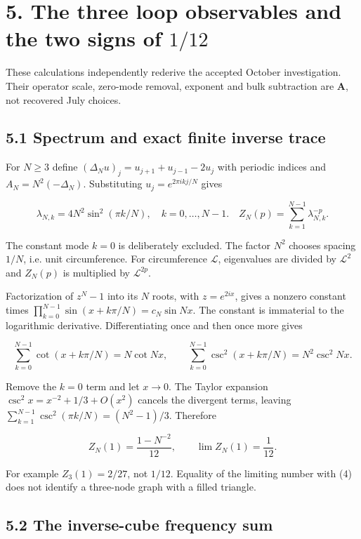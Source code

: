 \documentclass[11pt,a4paper]{article}
\begin{document}
\clearpage
\section*{5. The three loop observables and the two signs of $1/12$}

These calculations independently rederive the accepted October investigation. Their operator scale, zero-mode removal, exponent and bulk subtraction are \textbf{A}, not recovered July choices.


\subsection*{5.1 Spectrum and exact finite inverse trace}

For $N\geq3$ define $(\Delta_Nu)_j=u_{j+1}+u_{j-1}-2u_j$ with periodic indices and $A_N=N^2(-\Delta_N)$. Substituting $u_j=e^{2\pi ikj/N}$ gives


\[
\lambda_{N,k}=4N^2\sin^2(\pi k/N),\quad k=0,\ldots,N-1.
\quad Z_N(p)=\sum_{k=1}^{N-1}\lambda_{N,k}^{-p}. \tag{13}
\]

The constant mode $k=0$ is deliberately excluded. The factor $N^2$ chooses spacing $1/N$, i.e. unit circumference. For circumference $\mathcal L$, eigenvalues are divided by $\mathcal L^2$ and $Z_N(p)$ is multiplied by $\mathcal L^{2p}$.


Factorization of $z^N-1$ into its $N$ roots, with $z=e^{2ix}$, gives a nonzero constant times
$\prod_{k=0}^{N-1}\sin(x+k\pi/N)=c_N\sin Nx$.
The constant is immaterial to the logarithmic derivative. Differentiating once and then once more gives


\[
\sum_{k=0}^{N-1}\cot(x+k\pi/N)=N\cot Nx,\qquad
\sum_{k=0}^{N-1}\csc^2(x+k\pi/N)=N^2\csc^2 Nx. \tag{14}
\]

Remove the $k=0$ term and let $x\to0$. The Taylor expansion
$\csc^2x=x^{-2}+1/3+O(x^2)$ cancels the divergent terms, leaving
$\sum_{k=1}^{N-1}\csc^2(\pi k/N)=(N^2-1)/3$. Therefore


\[
Z_N(1)=\frac{1-N^{-2}}{12},\qquad
\lim Z_N(1)=\frac1{12}. \tag{15}
\]

For example $Z_3(1)=2/27$, not $1/12$. Equality of the limiting number with (4) does not identify a three-node graph with a filled triangle.


\subsection*{5.2 The inverse-cube frequency sum}
\end{document}
